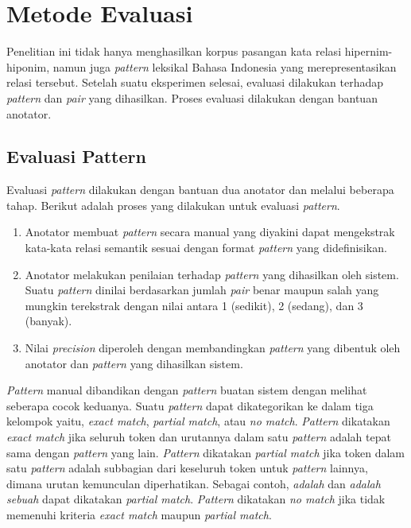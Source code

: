 \section{Metode Evaluasi}
Penelitian ini tidak hanya menghasilkan korpus pasangan kata relasi hipernim-hiponim, namun juga \textit{pattern} leksikal Bahasa Indonesia yang merepresentasikan relasi tersebut. Setelah suatu eksperimen selesai, evaluasi dilakukan terhadap \textit{pattern} dan \textit{pair} yang dihasilkan. Proses evaluasi dilakukan dengan bantuan anotator.

\subsection{Evaluasi Pattern}
Evaluasi \textit{pattern} dilakukan dengan bantuan dua anotator dan melalui beberapa tahap. Berikut adalah proses yang dilakukan untuk evaluasi \textit{pattern}.
\begin{enumerate}
  \item Anotator membuat \textit{pattern} secara manual yang diyakini dapat mengekstrak kata-kata relasi semantik sesuai dengan format \textit{pattern} yang didefinisikan.
  \item Anotator melakukan penilaian terhadap \textit{pattern} yang dihasilkan oleh sistem. Suatu \textit{pattern} dinilai berdasarkan jumlah \textit{pair} benar maupun salah yang mungkin terekstrak dengan nilai antara 1 (sedikit), 2 (sedang), dan 3 (banyak).
  \item Nilai \textit{precision} diperoleh dengan membandingkan \textit{pattern} yang dibentuk oleh anotator dan \textit{pattern} yang dihasilkan sistem.
\end{enumerate}

\textit{Pattern} manual dibandikan dengan \textit{pattern} buatan sistem dengan melihat seberapa cocok keduanya. Suatu \textit{pattern} dapat dikategorikan ke dalam tiga kelompok yaitu, \textit{exact match}, \textit{partial match}, atau \textit{no match}. \textit{Pattern} dikatakan \textit{exact match} jika seluruh token dan urutannya dalam satu \textit{pattern} adalah tepat sama dengan \textit{pattern} yang lain. \textit{Pattern} dikatakan \textit{partial match} jika token dalam satu \textit{pattern} adalah subbagian dari keseluruh token untuk \textit{pattern} lainnya, dimana urutan kemunculan diperhatikan. Sebagai contoh, \textit{{\tagHypernym} adalah {\tagHyponym}} dan \textit{{\tagHypernym} adalah sebuah {\tagHyponym}} dapat dikatakan \textit{partial match}. \textit{Pattern} dikatakan \textit{no match} jika tidak memenuhi kriteria \textit{exact match} maupun \textit{partial match}.


